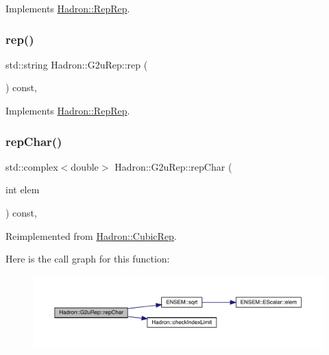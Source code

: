 Implements \mbox{\hyperlink{structHadron_1_1RepRep_ab3213025f6de249f7095892109575fde}{Hadron\+::\+Rep\+Rep}}.

\mbox{\label{structHadron_1_1G2uRep_ad0a703d8c70aacc4601afb6c47ca40b3}} 
\subsubsection{\texorpdfstring{rep()}{rep()}\hspace{0.1cm}{\footnotesize\ttfamily [5/5]}}
{\footnotesize\ttfamily std\+::string Hadron\+::\+G2u\+Rep\+::rep (\begin{DoxyParamCaption}{ }\end{DoxyParamCaption}) const\hspace{0.3cm}{\ttfamily [inline]}, {\ttfamily [virtual]}}



Implements \mbox{\hyperlink{structHadron_1_1RepRep_ab3213025f6de249f7095892109575fde}{Hadron\+::\+Rep\+Rep}}.

\mbox{\label{structHadron_1_1G2uRep_a51ea6b7795e07c824b72dbefb7fb6ddb}} 
\subsubsection{\texorpdfstring{repChar()}{repChar()}\hspace{0.1cm}{\footnotesize\ttfamily [1/3]}}
{\footnotesize\ttfamily std\+::complex$<$double$>$ Hadron\+::\+G2u\+Rep\+::rep\+Char (\begin{DoxyParamCaption}\item[{int}]{elem }\end{DoxyParamCaption}) const\hspace{0.3cm}{\ttfamily [inline]}, {\ttfamily [virtual]}}



Reimplemented from \mbox{\hyperlink{structHadron_1_1CubicRep_af45227106e8e715e84b0af69cd3b36f8}{Hadron\+::\+Cubic\+Rep}}.

Here is the call graph for this function\+:
\nopagebreak
\begin{figure}[H]
\begin{center}
\leavevmode
\includegraphics[width=350pt]{dc/dc0/structHadron_1_1G2uRep_a51ea6b7795e07c824b72dbefb7fb6ddb_cgraph}
\end{center}
\end{figure}
\mbox{\label{structHadron_1_1G2uRep_a51ea6b7795e07c824b72dbefb7fb6ddb}} 

